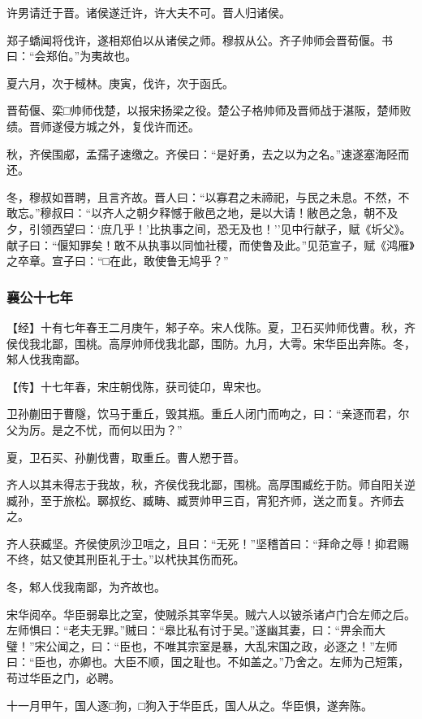 \documentclass[]{article}
\begin{document}
许男请迁于晋。诸侯遂迁许，许大夫不可。晋人归诸侯。

郑子蟜闻将伐许，遂相郑伯以从诸侯之师。穆叔从公。齐子帅师会晋荀偃。书曰：``会郑伯。''为夷故也。

夏六月，次于棫林。庚寅，伐许，次于函氏。

晋荀偃、栾□帅师伐楚，以报宋扬梁之役。楚公子格帅师及晋师战于湛阪，楚师败绩。晋师遂侵方城之外，复伐许而还。

秋，齐侯围郕，孟孺子速缴之。齐侯曰：``是好勇，去之以为之名。''速遂塞海陉而还。

冬，穆叔如晋聘，且言齐故。晋人曰：``以寡君之未禘祀，与民之未息。不然，不敢忘。''穆叔曰：``以齐人之朝夕释憾于敝邑之地，是以大请！敝邑之急，朝不及夕，引领西望曰：`庶几乎！'比执事之间，恐无及也！''见中行献子，赋《圻父》。献子曰：``偃知罪矣！敢不从执事以同恤社稷，而使鲁及此。''见范宣子，赋《鸿雁》之卒章。宣子曰：``□在此，敢使鲁无鸠乎？''

\hypertarget{header-n2041}{%
\subsubsection{襄公十七年}\label{header-n2041}}

【经】十有七年春王二月庚午，邾子卒。宋人伐陈。夏，卫石买帅师伐曹。秋，齐侯伐我北鄙，围桃。高厚帅师伐我北鄙，围防。九月，大雩。宋华臣出奔陈。冬，邾人伐我南鄙。

【传】十七年春，宋庄朝伐陈，获司徒卬，卑宋也。

卫孙蒯田于曹隧，饮马于重丘，毁其瓶。重丘人闭门而呴之，曰：``亲逐而君，尔父为厉。是之不忧，而何以田为？''

夏，卫石买、孙蒯伐曹，取重丘。曹人愬于晋。

齐人以其未得志于我故，秋，齐侯伐我北鄙，围桃。高厚围臧纥于防。师自阳关逆臧孙，至于旅松。郰叔纥、臧畴、臧贾帅甲三百，宵犯齐师，送之而复。齐师去之。

齐人获臧坚。齐侯使夙沙卫唁之，且曰：``无死！''坚稽首曰：``拜命之辱！抑君赐不终，姑又使其刑臣礼于士。''以杙抉其伤而死。

冬，邾人伐我南鄙，为齐故也。

宋华阅卒。华臣弱皋比之室，使贼杀其宰华吴。贼六人以铍杀诸卢门合左师之后。左师惧曰：``老夫无罪。''贼曰：``皋比私有讨于吴。''遂幽其妻，曰：``畀余而大璧！''宋公闻之，曰：``臣也，不唯其宗室是暴，大乱宋国之政，必逐之！''左师曰：``臣也，亦卿也。大臣不顺，国之耻也。不如盖之。''乃舍之。左师为己短策，苟过华臣之门，必聘。

十一月甲午，国人逐□狗，□狗入于华臣氏，国人从之。华臣惧，遂奔陈。
\end{document}

